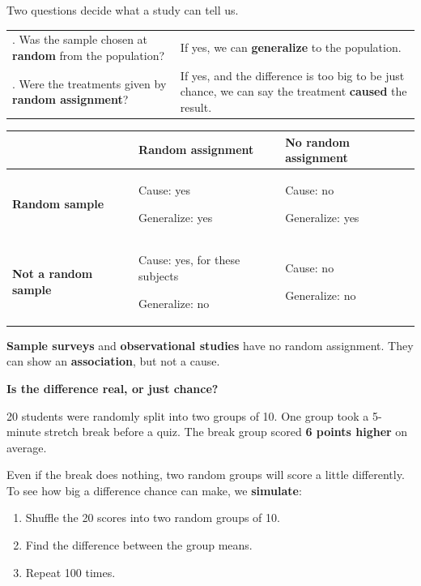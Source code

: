 \documentclass[11pt]{article}
\begin{document}

Two questions decide what a study can tell us.

\vspace{0.4em}
\begin{tabular}{@{}>{\raggedright\arraybackslash}p{3.4in}>{\raggedright\arraybackslash}p{3.2in}}
1. Was the sample chosen at \textbf{random} from the population? & If yes, we can \textbf{generalize} to the population.\\[0.4em]
2. Were the treatments given by \textbf{random assignment}? & If yes, and the difference is too big to be just chance, we can say the treatment \textbf{caused} the result.\\
\end{tabular}

\vspace{0.6em}
\begin{center}
\renewcommand{\arraystretch}{1.5}
\begin{tabular}{|l|>{\centering\arraybackslash}p{2.4in}|>{\centering\arraybackslash}p{2.4in}|}\hline
 & \textbf{Random assignment} & \textbf{No random assignment} \\ \hline
\textbf{Random sample} & Cause: yes\par Generalize: yes & Cause: no\par Generalize: yes \\ \hline
\textbf{Not a random sample} & Cause: yes, for these subjects\par Generalize: no & Cause: no\par Generalize: no \\ \hline
\end{tabular}
\end{center}

\textbf{Sample surveys} and \textbf{observational studies} have no random assignment. They can show an \textbf{association}, but not a cause.

\vspace{1em}
\textbf{Is the difference real, or just chance?}

\vspace{0.2em}
20 students were randomly split into two groups of 10. One group took a 5-minute stretch break before a quiz. The break group scored \textbf{6 points higher} on average.

\vspace{0.2em}
Even if the break does nothing, two random groups will score a little differently. To see how big a difference chance can make, we \textbf{simulate}:
\begin{enumerate}[itemsep=0pt,topsep=2pt]
  \item Shuffle the 20 scores into two random groups of 10.
  \item Find the difference between the group means.
  \item Repeat 100 times.
\end{enumerate}
\end{document}
